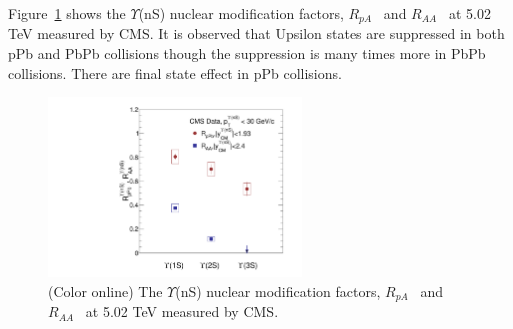 Figure~\ref{fig:LHCpBPbPb} shows the $\Upsilon$(nS) nuclear modification factors,
    $R_{pA}$~\cite{CMS:2022wfi} and $R_{AA}$~\cite{CMS:2018zza}
 at 5.02 TeV measured by CMS.
 It is observed that Upsilon states are suppressed in both pPb and PbPb collisions
 though the suppression is many times more in PbPb collisions. There are
 final state effect in pPb collisions. 
    

\begin{figure}
\centering
  \includegraphics[width=0.60\textwidth]{Figures/ExpOverview/Fig_LHC_YnSRPPbRAAInt.pdf}
  \caption{(Color online) The $\Upsilon$(nS) nuclear modification factors,
    $R_{pA}$~\cite{CMS:2022wfi} and $R_{AA}$~\cite{CMS:2018zza}
    at 5.02 TeV measured by CMS.
  }
 \label{fig:LHCpBPbPb}
\end{figure}



  

